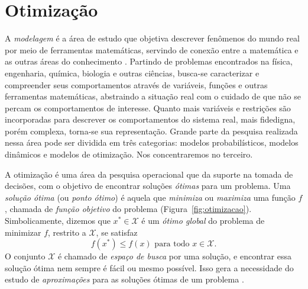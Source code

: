 \section{Otimização}





A \textit{modelagem} é a área de estudo que objetiva descrever fenômenos do mundo real por meio de ferramentas matemáticas, servindo de conexão entre a matemática e as outras áreas do conhecimento \cite{meerschaert2013mathematical}. Partindo de problemas encontrados na física, engenharia, química, biologia e outras ciências, busca-se caracterizar e compreender seus comportamentos através de variáveis, funções e outras ferramentas matemáticas, abstraindo a situação real com o cuidado de que não se percam os comportamentos de interesse. Quanto mais variáveis e restrições são incorporadas para descrever os comportamentos do sistema real, mais fidedigna, porém complexa, torna-se sua representação. Grande parte da pesquisa realizada nessa área pode ser dividida em três categorias: modelos probabilísticos, modelos dinâmicos e modelos de otimização. Nos concentraremos no terceiro.

A otimização é uma área da pesquisa operacional que da suporte na tomada de decisões, com o objetivo de encontrar soluções \textit{ótimas} para um problema. Uma \textit{solução ótima} (ou \textit{ponto ótimo}) é aquela que \textit{minimiza} ou \textit{maximiza} uma função $f$, chamada de \textit{função objetivo} do problema (Figura~\ref{fig:otimizacao}). Simbolicamente, dizemos que $x^* \in \mathcal{X}$ é um \textit{ótimo global} do problema de minimizar $f$, restrito a $\mathcal{X}$, se satisfaz 
\begin{equation}
	f(x^*)\leq f(x)\text{ para todo } x\in \mathcal{X}.
\end{equation} O conjunto $\mathcal{X}$ é chamado de \textit{espaço de busca} por uma solução, e encontrar essa solução ótima nem sempre é fácil ou mesmo possível. Isso gera a necessidade do estudo de \textit{aproximações} para as soluções ótimas de um problema \cite{elizabeth2013otimizaccao}.  

